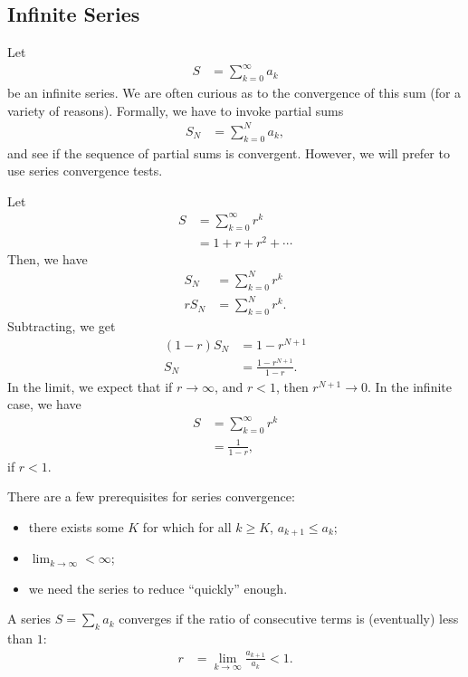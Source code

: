 \documentclass[10pt]{mypackage}
\begin{document}
\subsection{Infinite Series}%
Let
\begin{align*}
  S &= \sum_{k=0}^{\infty}a_k
\end{align*}
be an infinite series. We are often curious as to the convergence of this sum (for a variety of reasons). Formally, we have to invoke partial sums
\begin{align*}
  S_N &= \sum_{k=0}^{N}a_k,
\end{align*}
and see if the sequence of partial sums is convergent. However, we will prefer to use series convergence tests.

\begin{example}
  Let
  \begin{align*}
    S &= \sum_{k=0}^{\infty}r^k\\
      &= 1 + r + r^2 + \cdots
  \end{align*}
  Then, we have
  \begin{align*}
    S_N &= \sum_{k=0}^{N}r^k\\
    rS_N &= \sum_{k=0}^{N}r^k.
  \end{align*}
  Subtracting, we get
  \begin{align*}
    (1-r)S_N &= 1-r^{N+1}\\
    S_N &= \frac{1-r^{N+1}}{1-r}.
  \end{align*}
  In the limit, we expect that if $r\rightarrow \infty$, and $r < 1$, then $r^{N+1} \rightarrow 0$. In the infinite case, we have
  \begin{align*}
    S &= \sum_{k=0}^{\infty}r^k\\
      &= \frac{1}{1-r},
  \end{align*}
  if $r < 1$.
\end{example}
There are a few prerequisites for series convergence:
\begin{itemize}
  \item there exists some $K$ for which for all $k \geq K$, $a_{k+1} \leq a_{k}$;
  \item $\lim_{k\rightarrow\infty} < \infty$;
  \item we need the series to reduce ``quickly'' enough.
\end{itemize}
\begin{example}
  A series $S = \sum_{k}a_k$ converges if the ratio of consecutive terms is (eventually) less than $1$:
  \begin{align*}
    r &= \lim_{k\rightarrow\infty}\frac{a_{k+1}}{a_k} < 1.
  \end{align*}
\end{example}
\end{document}
